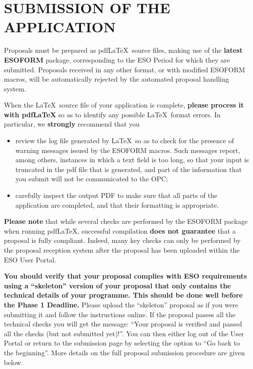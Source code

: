 \documentclass{article}
\begin{document}

\section{SUBMISSION OF THE APPLICATION}
\label{sec:submission}

Proposals must be prepared as pdf\LaTeX\ source files, making use of
the {\bf latest ESOFORM} package, corresponding to the ESO Period
for which they are submitted.  Proposals received in
any other format, or with modified ESOFORM macros, will be
automatically rejected by the automated proposal handling system.

When the \LaTeX\ source file of your application is complete, {\bf
please process it with pdf\LaTeX} so as to identify any
possible \LaTeX\ format errors. In particular, we {\bf strongly}
recommend that you
\begin{itemize} 
\item review the log file generated by \LaTeX\ so as to
  check for the presence of warning messages issued by the ESOFORM
  macros. Such messages report, among others, instances in which a text
  field is too long, so that your input is truncated in the pdf file
  that is generated, and part of the information that you
  submit will not be communicated to the OPC;
\item carefully inspect the output PDF to make sure that
  all parts of the application are completed, and that their
  formatting is appropriate.
\end{itemize} 

{\bf Please note} that while several checks are
performed by the ESOFORM package when running pdf\LaTeX, successful 
compilation  {\bf does not guarantee} that a proposal is
fully compliant. Indeed, many key checks 
can only be performed by the proposal reception system after the proposal
has been uploaded within the ESO User Portal.

{\bf You should verify that your proposal complies with ESO
requirements using a ``skeleton'' version of  your proposal that
only contains the technical details of your  programme. This should be done well before the Phase 1 Deadline.} Please upload the ``skeleton'' proposal as if you were submitting it and follow the instructions online.
If the proposal passes all the technical checks you will get the message:
``Your proposal is verified and passed all the checks (but not submitted yet)!''.
You can then either log out of the User Portal or 
return to the submission page by selecting the option to 
``Go back to the beginning''. 
More details on the full proposal submission procedure are given below.
\end{document}
